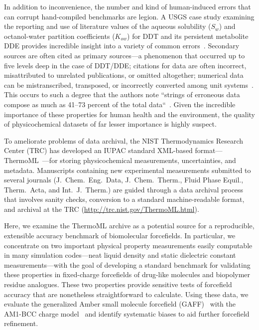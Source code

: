 \documentclass[aps,pre,twocolumn,nofootinbib,superscriptaddress,linenumbers]{revtex4-1}
\begin{document}
In addition to inconvenience, the number and kind of human-induced errors that can corrupt hand-compiled benchmarks are legion.
A USGS case study examining the reporting and use of literature values of the aqueous solubility ($S_w$) and octanol-water partition coefficients ($K_{ow}$) for DDT and its persistent metabolite DDE provides incredible insight into a variety of common errors~\cite{usgs-ddt-report}.
Secondary sources are often cited as primary sources---a phenomenon that occurred up to five levels deep in the case of DDT/DDE;
citations for data are often incorrect, misattributed to unrelated publications, or omitted altogether;
numerical data can be mistranscribed, transposed, or incorrectly converted among unit systems~\cite{usgs-ddt-report}.
This occurs to such a degree that the authors note ``strings of erroneous data compose as much as 41--73 percent of the total data``~\cite{usgs-ddt-report}.
Given the incredible importance of these properties for human health and the environment, the quality of physicochemical datasets of far lesser importance is highly suspect.

To ameliorate problems of data archival, the NIST Thermodynamics Research Center (TRC) has developed an IUPAC standard XML-based format---ThermoML~\cite{frenkel2003thermoml, frenkel2006xml, chirico2013improvement}---for storing physicochemical measurements, uncertainties, and metadata.
Manuscripts containing new experimental measurements submitted to several journals (J.~Chem.~Eng.~Data, J.~Chem.~Therm., Fluid Phase Equil., Therm.~Acta, and Int.~J.~Therm.) are guided through a data archival process that involves sanity checks, conversion to a standard machine-readable format, and archival at the TRC (\url{http://trc.nist.gov/ThermoML.html}).  

Here, we examine the ThermoML archive as a potential source for a reproducible, extensible accuracy benchmark of biomolecular forcefields.
In particular, we concentrate on two important physical property measurements easily computable in many simulation codes---neat liquid density and static dielectric constant measurements---with the goal of developing a standard benchmark for validating these properties in fixed-charge forcefields of drug-like molecules and biopolymer residue analogues.  
These two properties provide sensitive tests of forcefield accuracy that are nonetheless straightforward to calculate.  
Using these data, we evaluate the generalized Amber small molecule forcefield (GAFF)~\cite{gaff,gaff2} with the AM1-BCC charge model~\cite{am1bcc1,am1bcc2} and identify systematic biases to aid further forcefield refinement.
\end{document}
